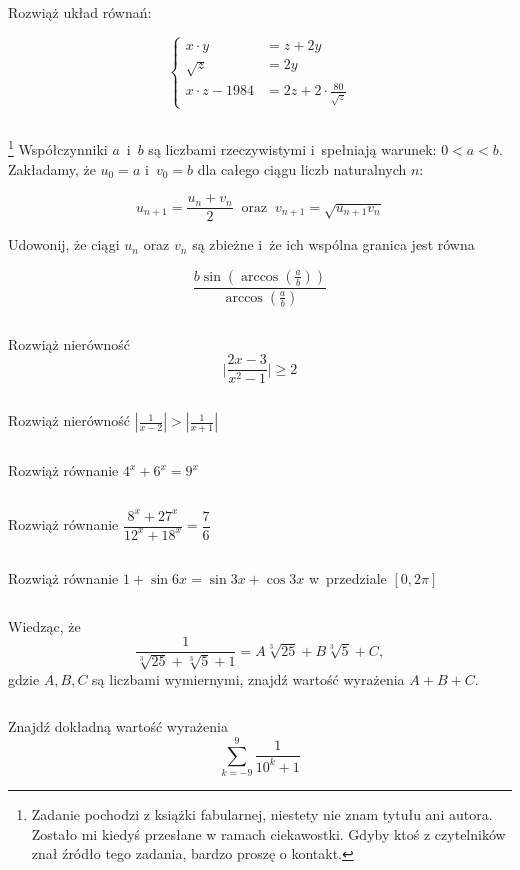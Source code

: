 $ $

\begin{zada}
Rozwiąż układ równań:

\[ \begin{cases}
x \cdot y &= z + 2y  \\
\sqrt{z} &= 2y \\
x \cdot z - 1984 &= 2z + 2 \cdot \frac{80}{\sqrt{z}} 
\end{cases} \]

\end{zada}

$ $

\begin{zada} \footnote{Zadanie pochodzi z książki fabularnej, niestety nie znam tytułu ani autora. Zostało mi kiedyś przesłane w ramach ciekawostki. Gdyby ktoś z czytelników znał źródło tego zadania, bardzo proszę o kontakt.}
Współczynniki $a$~i~$b$ są liczbami rzeczywistymi i~spełniają warunek: $0<a<b.$ Zakładamy, że $u_{0}=a$ i~$v_{0}=b$ dla całego ciągu liczb naturalnych $n$:

\[ u_{n+1}=\frac{u_{n}+v_{n}}{2} \ \textrm{ oraz } \ v_{n+1}=\sqrt{u_{n+1}v_{n}}\]

Udowonij, że ciągi $u_{n}$ oraz $v_{n}$ są zbieżne i~że ich wspólna granica jest równa

\[ \frac{b\sin(\arccos(\frac{a}{b}))}{\arccos(\frac{a}{b})} \]
\end{zada}

$ $

\begin{zada} %
Rozwiąż nierówność
\[ \Big|\frac{2x-3}{x^2-1}\Big| \geq 2 \]
\end{zada}

$ $

\begin{zada}
Rozwiąż nierówność $|\frac{1}{x-2}|>|\frac{1}{x+1}|$
\end{zada}

$ $

\begin{zada}
Rozwiąż równanie $4^x + 6^x = 9^x$
\end{zada}

$ $

\begin{zada}
Rozwiąż równanie $\dfrac{8^x+27^x}{12^x+18^x}=\dfrac{7}{6}$
\end{zada}

$ $

\begin{zada}
Rozwiąż równanie $1+\sin6x = \sin3x + \cos3x$ w~przedziale $[0,2\pi]$
\end{zada}

$ $

\begin{zada}
Wiedząc, że 
\[\frac{1}{\sqrt[3]{25}+\sqrt[3]{5}+1} = A\sqrt[3]{25}+B\sqrt[3]{5}+C, \]
gdzie $A,B,C$ są liczbami wymiernymi, znajdź wartość wyrażenia $A+B+C$. 
\end{zada}

$ $

\begin{zada}
Znajdź dokładną wartość wyrażenia 
\[ \sum_{k=-9}^{9} \frac{1}{10^{k}+1}\]
\end{zada}

    
%
